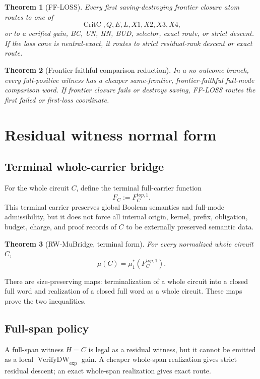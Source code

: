\documentclass[10.5pt,a4paper]{article}
\newtheorem{theorem}{Theorem}[section]
\newcommand{\VerifyDW}{\operatorname{VerifyDW}_{\exp}}
\newcommand{\CritC}{\operatorname{CritC}}
\begin{document}
\begin{theorem}[FF-LOSS]
Every first saving-destroying frontier closure atom routes to one of
\[
\CritC,Q,E,L,X1,X2,X3,X4,
\]
or to a verified gain, BC, UN, HN, BUD, selector, exact route, or strict descent. If the loss cone is neutral-exact, it routes to strict residual-rank descent or exact route.
\end{theorem}

\begin{theorem}[Frontier-faithful comparison reduction]
In a no-outcome branch, every full-positive witness has a cheaper same-frontier, frontier-faithful full-mode comparison word. If frontier closure fails or destroys saving, FF-LOSS routes the first failed or first-loss coordinate.
\end{theorem}

\section{Residual witness normal form}

\subsection{Terminal whole-carrier bridge}
For the whole circuit \(C\), define the terminal full-carrier function
\[
F_C:=F_C^{top,1}.
\]
This terminal carrier preserves global Boolean semantics and full-mode admissibility, but it does not force all internal origin, kernel, prefix, obligation, budget, charge, and proof records of \(C\) to be externally preserved semantic data.

\begin{theorem}[RW-MuBridge, terminal form]
For every normalized whole circuit \(C\),
\[
\mu(C)=\mu_1^*(F_C^{top,1}).
\]
\end{theorem}

There are size-preserving maps: terminalization of a whole circuit into a closed full word and realization of a closed full word as a whole circuit. These maps prove the two inequalities.

\subsection{Full-span policy}
A full-span witness \(H=C\) is legal as a residual witness, but it cannot be emitted as a local \(\VerifyDW\) gain. A cheaper whole-span realization gives strict residual descent; an exact whole-span realization gives exact route.
\end{document}
